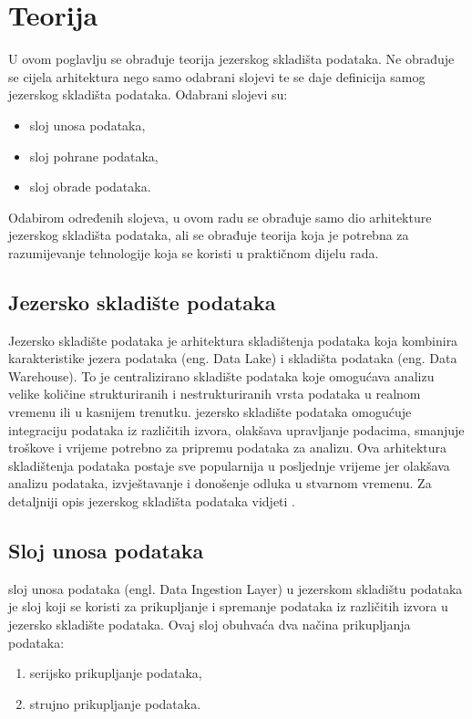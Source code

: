 \chapter{Teorija} \label{chapter:teorija} 

U ovom poglavlju se obrađuje teorija jezerskog skladišta podataka. Ne obrađuje
se cijela arhitektura nego samo odabrani slojevi te se daje definicija samog
jezerskog skladišta podataka. Odabrani slojevi su:
\begin{itemize}
    \item sloj unosa podataka,
    \item sloj pohrane podataka,
    \item sloj obrade podataka.
\end{itemize}
Odabirom određenih slojeva, u ovom radu se obrađuje samo dio arhitekture
jezerskog skladišta podataka, ali se obrađuje teorija koja je potrebna za
razumijevanje tehnologije koja se koristi u praktičnom dijelu rada. 

\section{Jezersko skladište podataka} \label{section:jezersko_skladiste_podataka}

Jezersko skladište podataka je arhitektura skladištenja
podataka koja kombinira karakteristike jezera podataka (eng. Data Lake) i
skladišta podataka (eng. Data Warehouse). To je centralizirano skladište
podataka koje omogućava analizu velike količine strukturiranih i
nestrukturiranih vrsta podataka u realnom vremenu ili u kasnijem trenutku.
jezersko skladište podataka omogućuje integraciju podataka iz različitih izvora,
olakšava upravljanje podacima, smanjuje troškove i vrijeme potrebno za pripremu
podataka za analizu. Ova arhitektura skladištenja podataka postaje sve
popularnija u posljednje vrijeme jer olakšava analizu podataka, izvještavanje i
donošenje odluka u stvarnom vremenu. Za detaljniji opis jezerskog skladišta
podataka vidjeti \cite{datalakehouse2022}.

\section{Sloj unosa podataka} \label{section:sloj_unosa_podataka}

sloj unosa podataka (engl. Data Ingestion Layer) u jezerskom skladištu podataka
je sloj koji se koristi za prikupljanje i spremanje podataka iz različitih
izvora u jezersko skladište podataka. Ovaj sloj obuhvaća dva načina prikupljanja
podataka:
\begin{enumerate}
    \item serijsko prikupljanje podataka,
    \item strujno prikupljanje podataka.
\end{enumerate}

